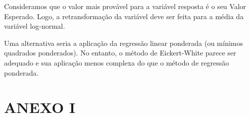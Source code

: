 \documentclass[a4paper]{article}
\begin{document}
Consideramos que o valor mais provável para a variável resposta é o seu
Valor Esperado. Logo, a retransformação da variável deve ser feita para
a média da variável log-normal.

Uma alternativa seria a aplicação da regressão linear ponderada (ou
mínimos quadrados ponderados). No entanto, o método de Eickert-White
parece ser adequado e sua aplicação menos complexa do que o método de
regressão ponderada. \newpage

\hypertarget{anexo-i}{\section*{ANEXO I}\label{anexo-i}}

\begin{table}[H]
\centering{}


\end{table}
\end{document}

